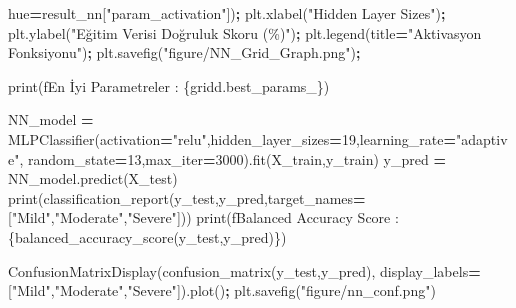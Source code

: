 \documentclass[12pt,twoside]{deuthesis}
\newenvironment{Shaded}{\begin{snugshade}}{\end{snugshade}}
\newcommand{\BuiltInTok}[1]{#1}
\newcommand{\DecValTok}[1]{\textcolor[rgb]{0.00,0.00,0.81}{#1}}
\newcommand{\NormalTok}[1]{#1}
\newcommand{\OperatorTok}[1]{\textcolor[rgb]{0.81,0.36,0.00}{\textbf{#1}}}
\newcommand{\SpecialCharTok}[1]{\textcolor[rgb]{0.00,0.00,0.00}{#1}}
\newcommand{\SpecialStringTok}[1]{\textcolor[rgb]{0.31,0.60,0.02}{#1}}
\newcommand{\StringTok}[1]{\textcolor[rgb]{0.31,0.60,0.02}{#1}}
\begin{document}
\begin{Shaded}
\begin{Highlighting}[]
\NormalTok{             hue}\OperatorTok{=}\NormalTok{result\_nn[}\StringTok{"param\_activation"}\NormalTok{])}\OperatorTok{;}
\NormalTok{plt.xlabel(}\StringTok{"Hidden Layer Sizes"}\NormalTok{)}\OperatorTok{;}
\NormalTok{plt.ylabel(}\StringTok{"Eğitim Verisi Doğruluk Skoru (\%)"}\NormalTok{)}\OperatorTok{;}
\NormalTok{plt.legend(title}\OperatorTok{=}\StringTok{"Aktivasyon Fonksiyonu"}\NormalTok{)}\OperatorTok{;}
\NormalTok{plt.savefig(}\StringTok{"figure/NN\_Grid\_Graph.png"}\NormalTok{)}\OperatorTok{;}
\end{Highlighting}
\end{Shaded}
\begin{Shaded}
\begin{Highlighting}[]
\BuiltInTok{print}\NormalTok{(}\SpecialStringTok{f\textquotesingle{}En İyi Parametreler : }\SpecialCharTok{\{}\NormalTok{gridd}\SpecialCharTok{.}\NormalTok{best\_params\_}\SpecialCharTok{\}}\SpecialStringTok{\textquotesingle{}}\NormalTok{)}
\end{Highlighting}
\end{Shaded}
\begin{Shaded}
\begin{Highlighting}[]
\NormalTok{NN\_model }\OperatorTok{=}\NormalTok{ MLPClassifier(activation}\OperatorTok{=}\StringTok{"relu"}\NormalTok{,hidden\_layer\_sizes}\OperatorTok{=}\DecValTok{19}\NormalTok{,learning\_rate}\OperatorTok{=}\StringTok{"adaptive"}\NormalTok{,}
\NormalTok{                         random\_state}\OperatorTok{=}\DecValTok{13}\NormalTok{,max\_iter}\OperatorTok{=}\DecValTok{3000}\NormalTok{).fit(X\_train,y\_train)}
\NormalTok{y\_pred }\OperatorTok{=}\NormalTok{ NN\_model.predict(X\_test)}
\BuiltInTok{print}\NormalTok{(classification\_report(y\_test,y\_pred,target\_names}\OperatorTok{=}\NormalTok{[}\StringTok{"Mild"}\NormalTok{,}\StringTok{"Moderate"}\NormalTok{,}\StringTok{"Severe"}\NormalTok{]))}
\BuiltInTok{print}\NormalTok{(}\SpecialStringTok{f\textquotesingle{}Balanced Accuracy Score : }\SpecialCharTok{\{}\NormalTok{balanced\_accuracy\_score(y\_test,y\_pred)}\SpecialCharTok{\}}\SpecialStringTok{\textquotesingle{}}\NormalTok{)}
\end{Highlighting}
\end{Shaded}
\begin{Shaded}
\begin{Highlighting}[]
\NormalTok{ConfusionMatrixDisplay(confusion\_matrix(y\_test,y\_pred),}
\NormalTok{                       display\_labels}\OperatorTok{=}\NormalTok{[}\StringTok{"Mild"}\NormalTok{,}\StringTok{"Moderate"}\NormalTok{,}\StringTok{"Severe"}\NormalTok{]).plot()}\OperatorTok{;}
\NormalTok{plt.savefig(}\StringTok{"figure/nn\_conf.png"}\NormalTok{)}
\end{Highlighting}
\end{Shaded}
\end{document}
